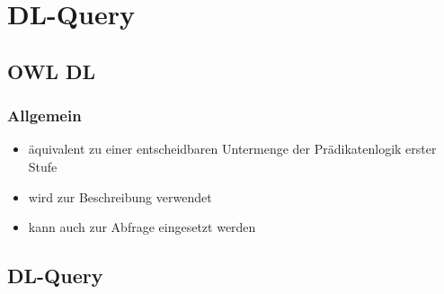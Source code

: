 \section{DL-Query}
\subsection{OWL DL}
\begin{frame}
	\frametitle{Allgemein}
	\begin{itemize}
		\item \"aquivalent zu einer entscheidbaren Untermenge der Pr\"adikatenlogik erster Stufe
		\item wird zur Beschreibung verwendet
		\item kann auch zur Abfrage eingesetzt werden
	\end{itemize}
\end{frame}

\subsection{DL-Query}
\begin{frame}

\end{frame}
